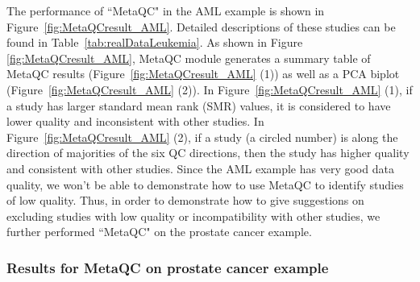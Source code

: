 The performance of ``MetaQC" in the AML example is shown in Figure~\ref{fig:MetaQCresult_AML}.
Detailed descriptions of these studies can be found in Table~\ref{tab:realDataLeukemia}. 
As shown in Figure \ref{fig:MetaQCresult_AML}, 
MetaQC module generates a summary table of MetaQC results (Figure~\ref{fig:MetaQCresult_AML} {\color{red} (1)}) 
as well as a PCA biplot (Figure~\ref{fig:MetaQCresult_AML} {\color{red} (2)}). 
In Figure~\ref{fig:MetaQCresult_AML} {\color{red} (1)},
if a study has larger standard mean rank (SMR) values, 
it is considered to have lower quality and inconsistent with other studies.
In Figure~\ref{fig:MetaQCresult_AML} {\color{red} (2)},
if a study (a circled number) is along the direction of majorities of the six QC directions, then the study has higher quality and consistent with other studies.
Since the AML example has very good data quality,
we won't be able to demonstrate how to use MetaQC to identify studies of low quality.
Thus, in order to demonstrate how to give suggestions on excluding studies with low quality or incompatibility with other studies,
we further performed ``MetaQC" on the prostate cancer example.

\subsubsection{Results for MetaQC on prostate cancer example}




